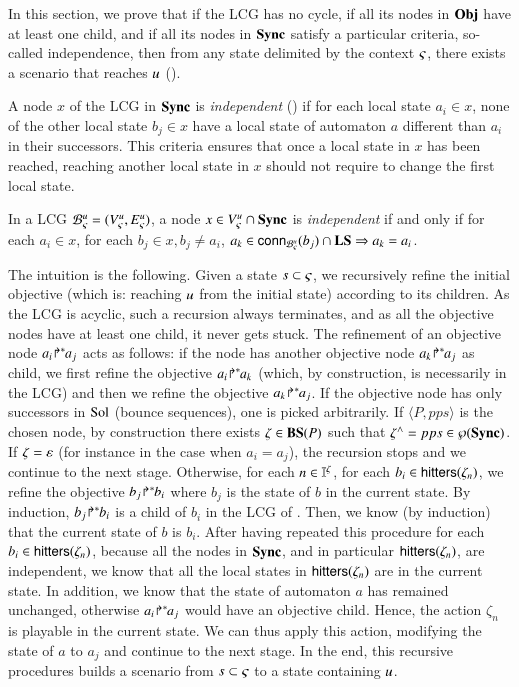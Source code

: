 In this section, we prove that if the LCG has no cycle, if all its nodes in $\mathbf{Obj}$ have at least one
child, and if all its nodes in $\mathbf{Sync}$ satisfy a
particular criteria, so-called independence, then from any state
delimited by the context $\varsigma$, there exists a scenario that reaches $u$
().

A node $x$ of the LCG in $\mathbf{Sync}$ is \emph{independent} () if for each local state
$a_i\in x$, none of the other local state $b_j\in x$ have a local state of automaton $a$ different
than $a_i$ in their successors.
This criteria ensures that once a local state in $x$ has been reached, reaching another local state
in $x$ should not require to change the first local state.

\begin{definition}
\label{def:coherent}
  In a LCG ${\mathcal{B}_{\varsigma}^{u}} = ({V_\varsigma^u}, {E_\varsigma^u})$,
  a node $x \in {V_\varsigma^u}\cap\mathbf{Sync}$ is \emph{independent} if and only if
  for each $a_i\in x$,
  for each $b_j\in x, b_j\neq a_i$,
  $a_k \in\mathsf{conn}_{{\mathcal{B}_{\varsigma}^{u}}}(b_j) \cap \mathbf{LS} \Rightarrow a_k = a_i$.
\end{definition}

The intuition is the following.
Given a state $s\subset\varsigma$, we recursively refine the initial objective
(which is: reaching $u$ from the initial state) according to its children.
As the LCG is acyclic, such a recursion always terminates, and as all the objective nodes have at
least one child, it never gets stuck.
The refinement of an objective node ${a_i\!\Rsh^*\!\!a_j}$ acts as follows:
if the node has another objective node ${a_k\!\Rsh^*\!\!a_j}$ as child, we first refine the objective
${a_i\!\Rsh^*\!\!a_k}$ (which, by construction, is necessarily in the LCG)
and then we refine the objective ${a_k\!\Rsh^*\!\!a_j}$.
If the objective node has only successors in $\mathrm{Sol}$ (bounce sequences), one is picked arbitrarily.
If $\langle P, pps\rangle$ is the chosen node,
by construction there exists $\zeta\in\mathbf{BS}(P)$ such that $\zeta^\wedge = pps \in \wp(\mathbf{Sync})$.
If $\zeta = \varepsilon$ (for instance in the case when $a_i = a_j$), the recursion stops and we
continue to the next stage.
Otherwise, for each $n\in\mathbb{I}^{\zeta}$,
for each $b_i \in\mathsf{hitters}(\zeta_n)$,
we refine the objective ${b_j\!\Rsh^*\!\!b_i}$ where $b_j$ is the state of $b$ in the current state.
By induction, ${b_j\!\Rsh^*\!\!b_i}$ is a child of $b_i$ in the LCG of .
Then, we know (by induction) that the current state of $b$ is $b_i$.
After having repeated this procedure for each $b_i\in\mathsf{hitters}(\zeta_n)$,
because all the nodes in $\mathbf{Sync}$, and in particular $\mathsf{hitters}(\zeta_n)$, are independent,
we know that all the local states in $\mathsf{hitters}(\zeta_n)$ are in the current state.
In addition, we know that the state of automaton $a$ has remained unchanged, otherwise
${a_i\!\Rsh^*\!\!a_j}$ would have an objective child.
Hence, the action $\zeta_n$ is playable in the current state.
We can thus apply this action, modifying the state of $a$ to $a_j$ and continue to the next stage.
In the end, this recursive procedures builds a scenario from $s\subset\varsigma$ to a state containing $u$.

